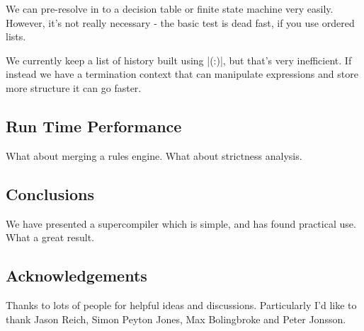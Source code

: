 \documentclass[draft]{sigplanconf}
\begin{document}
We can pre-resolve in to a decision table or finite state machine very easily. However, it's not really necessary - the basic test is dead fast, if you use ordered lists.

We currently keep a list of history built using |(:)|, but that's very inefficient. If instead we have a termination context that can manipulate expressions and store more structure it can go faster.

\subsection{Run Time Performance}

What about merging a rules engine. What about strictness analysis.

\subsection{Conclusions}

We have presented a supercompiler which is simple, and has found practical use. What a great result.


\subsection{Acknowledgements}

Thanks to lots of people for helpful ideas and discussions. Particularly I'd like to thank Jason Reich, Simon Peyton Jones, Max Bolingbroke and Peter Jonsson.



\end{document}
